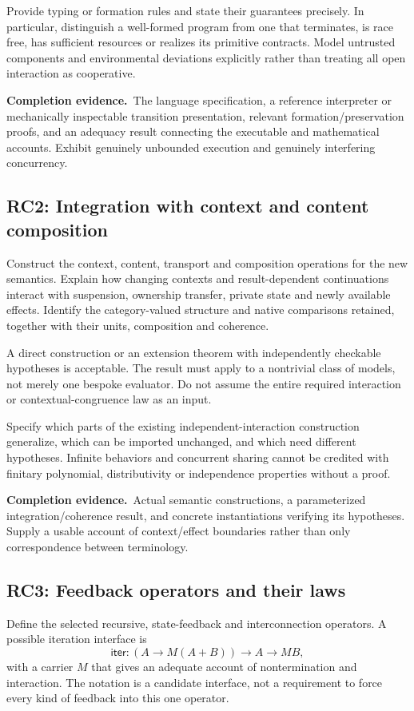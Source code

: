 \documentclass[11pt,a4paper]{article}
\newcommand{\deliver}{\par\textbf{Completion evidence.}\ }
\begin{document}
Provide typing or formation rules and state their guarantees precisely. In particular, distinguish a well-formed program from one that terminates, is race free, has sufficient resources or realizes its primitive contracts. Model untrusted components and environmental deviations explicitly rather than treating all open interaction as cooperative.

\deliver The language specification, a reference interpreter or mechanically inspectable transition presentation, relevant formation/preservation proofs, and an adequacy result connecting the executable and mathematical accounts. Exhibit genuinely unbounded execution and genuinely interfering concurrency.

\subsection*{RC2: Integration with context and content composition}\label{rc2}
Construct the context, content, transport and composition operations for the new semantics. Explain how changing contexts and result-dependent continuations interact with suspension, ownership transfer, private state and newly available effects. Identify the category-valued structure and native comparisons retained, together with their units, composition and coherence.

A direct construction or an extension theorem with independently checkable hypotheses is acceptable. The result must apply to a nontrivial class of models, not merely one bespoke evaluator. Do not assume the entire required interaction or contextual-congruence law as an input.

Specify which parts of the existing independent-interaction construction generalize, which can be imported unchanged, and which need different hypotheses. Infinite behaviors and concurrent sharing cannot be credited with finitary polynomial, distributivity or independence properties without a proof.

\deliver Actual semantic constructions, a parameterized integration/coherence result, and concrete instantiations verifying its hypotheses. Supply a usable account of context/effect boundaries rather than only correspondence between terminology.

\subsection*{RC3: Feedback operators and their laws}\label{rc3}
Define the selected recursive, state-feedback and interconnection operators. A possible iteration interface is
\[
\mathsf{iter}:(A\to M(A+B))\to A\to MB,
\]
with a carrier \(M\) that gives an adequate account of nontermination and interaction. The notation is a candidate interface, not a requirement to force every kind of feedback into this one operator.
\end{document}
